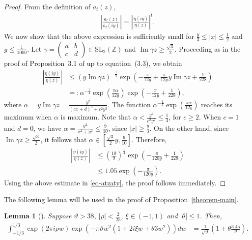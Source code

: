 \documentclass[10pt,a4paper]{amsart}
\newtheorem{lemma}[theorem]{Lemma}
\renewcommand{\Im}{\operatorname{Im}}
\numberwithin{equation}{section}
\begin{document}
	\begin{proof}
		From the definition of $a_t(z)$,
		\begin{align}\label{eq-atzaty}
			\left| \frac{a_t(z)}{a_t(iy)} \right| = \left| \frac{\eta(iy)}{\eta(z)} \right|^{t}.
		\end{align}
		We now show that the above expression is sufficiently small for $\frac{y}{3}\le |x|\le \frac{1}{2}$ and $y\le \frac{1}{1000}$.
		Let $\gamma= \begin{pmatrix}
			a & b\\
			c & d
		\end{pmatrix}\in \text{SL}_2(\mathbb{Z}) $ and $\Im \gamma z\ge \frac{\sqrt{3}}{2}$.
		Proceeding as in the proof of Proposition~3.1 of \cite{barman2026asymptotic} up to equation~(3.3), we obtain
		\begin{align*}
			\left|\frac{\eta(iy)}{\eta(z)}\right|&\le \left(y\Im \gamma z\right)^{-\frac{1}{4}}\exp\left(-\frac{\pi}{12y}+\frac{\pi}{12y}y\Im \gamma z+\frac{1}{228}\right)\\
			&=:\alpha^{-\frac{1}{4}}\exp\left(\frac{\pi\alpha}{12y}\right)\exp\left(-\frac{\pi}{12y}+\frac{1}{228}\right),
		\end{align*}
		where $\alpha=y\Im \gamma z=\frac{y^{2}}{(cx+d)^{2}+c^{2}y^{2}}$. The function $\alpha^{-\frac{1}{4}}\exp\left(\frac{\pi\alpha}{12y}\right)$ reaches its maximum when $\alpha$ is maximum. Note that  $\alpha<\frac{y^{2}}{c^{2}y^{2}}\le \frac{1}{4}$, for $c\ge 2$. When $c = 1$ and $d = 0$, we have $\alpha=\frac{y^{2}}{x^{2}+y^{2}}\le\frac{9}{10}$, since $|x| \ge \frac{y}{3}$. On the other hand, since $\Im \gamma z \ge \frac{\sqrt{3}}{2}$, it follows that $\alpha \in\left[\frac{\sqrt{3}}{2}y, \frac{9}{10}\right]$. Therefore,
		\begin{align*}
			\left|\frac{\eta(iy)}{\eta(z)}\right|&\le\left(\frac{10}{9}\right)^{\frac{1}{4}}\exp\left(-\frac{\pi}{120y}+\frac{1}{228}\right)  \\
			&\le 1.05 \exp\left(-\frac{\pi}{120y}\right).
		\end{align*}
		Using the above estimate in \eqref{eq-atzaty}, the proof follows immediately.
	\end{proof}
		The following lemma will be used in the proof of Proposition~\ref{theorem-main}.
	\begin{lemma}[{\cite[Lemma 4.1]{tyler2026asymptotics}}]\label{lemma-tyler}
		Suppose $\vartheta>38$, $|\rho|<\frac{2}{25}$, $\xi \in(-1,1)$ and $|\theta|\le 1$. Then,
		\begin{align*}
			\int_{-1/3}^{1/3}\exp\left(2\pi i\rho w\right)\exp\left(-\pi\vartheta w^{2}\left(1+2i\xi w+\theta 3w^{2}\right)\right)dw&=\frac{1}{\sqrt{\vartheta}}\left(1+\theta\frac{3.45}{\vartheta}\right).
		\end{align*}
	\end{lemma}
\end{document}
